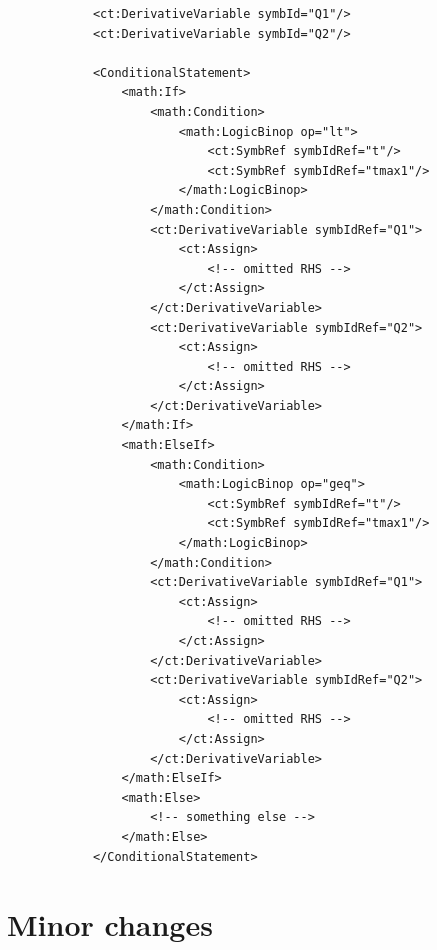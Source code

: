 \lstset{language=XML}
\begin{lstlisting}
            <ct:DerivativeVariable symbId="Q1"/>
            <ct:DerivativeVariable symbId="Q2"/>

            <ConditionalStatement>
                <math:If>
                    <math:Condition>
                        <math:LogicBinop op="lt">
                            <ct:SymbRef symbIdRef="t"/>
                            <ct:SymbRef symbIdRef="tmax1"/>
                        </math:LogicBinop>
                    </math:Condition>
                    <ct:DerivativeVariable symbIdRef="Q1">
                        <ct:Assign>
                            <!-- omitted RHS -->
                        </ct:Assign>
                    </ct:DerivativeVariable>
                    <ct:DerivativeVariable symbIdRef="Q2">
                        <ct:Assign>
                            <!-- omitted RHS -->
                        </ct:Assign>
                    </ct:DerivativeVariable>
                </math:If>
                <math:ElseIf>
                    <math:Condition>
                        <math:LogicBinop op="geq">
                            <ct:SymbRef symbIdRef="t"/>
                            <ct:SymbRef symbIdRef="tmax1"/>
                        </math:LogicBinop>
                    </math:Condition>
                    <ct:DerivativeVariable symbIdRef="Q1">
                        <ct:Assign>
                            <!-- omitted RHS -->
                        </ct:Assign>
                    </ct:DerivativeVariable>
                    <ct:DerivativeVariable symbIdRef="Q2">
                        <ct:Assign>
                            <!-- omitted RHS -->
                        </ct:Assign>
                    </ct:DerivativeVariable>
                </math:ElseIf>
                <math:Else>
                    <!-- something else -->
                </math:Else>
            </ConditionalStatement>
\end{lstlisting}


\section{Minor changes}
\label{sec:minors}

